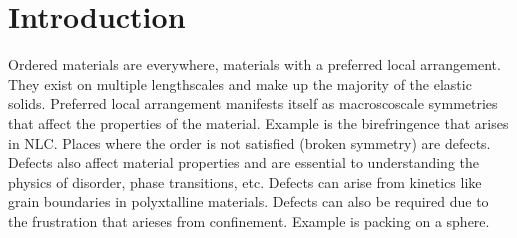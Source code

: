 \chapter{Introduction}
Ordered materials are everywhere, materials with a preferred local arrangement.
They exist on multiple lengthscales and make up the majority of the elastic solids.
Preferred local arrangement manifests itself as macroscoscale symmetries that affect the properties of the material.
Example is the birefringence that arises in NLC.
Places where the order is not satisfied (broken symmetry) are defects.
Defects also affect material properties and are essential to understanding the physics of disorder, phase transitions, etc.
Defects can arise from kinetics like grain boundaries in polyxtalline materials.
Defects can also be required due to the frustration that arieses from confinement.
Example is packing on a sphere.
